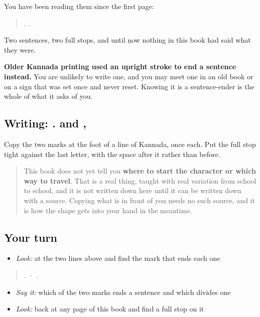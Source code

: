 You have been reading them since the first page:

\begin{quote}
 .   .
\end{quote}

Two sentences, two full stops, and until now nothing in this book had said what they were.

\textbf{Older Kannada printing used an upright stroke to end a sentence instead.} You are unlikely to write one, and you may meet one in an old book or on a sign that was set once and never reset. Knowing it is a sentence-ender is the whole of what it asks of you.

\subsection*{Writing: . and ,}
Copy the two marks at the foot of a line of Kannada, once each. Put the full stop tight against the last letter, with the space after it rather than before.

\begin{quote}
This book does not yet tell you \textbf{where to start the character or which way to travel}. That is a real thing, taught with real variation from school to school, and it is not written down here until it can be written down with a source. Copying what is in front of you needs no such source, and it is how the shape gets into your hand in the meantime.
\end{quote}

\subsection*{Your turn}
\begin{itemize}
\raggedright
  \item \emph{Look:} at the two lines above and find the mark that ends each one
\end{itemize}

\begin{quote}
 .  ·    .
\end{quote}

\begin{itemize}
\raggedright
  \item \emph{Say it:} which of the two marks ends a sentence and which divides one
  \item \emph{Look:} back at any page of this book and find a full stop on it
\end{itemize}

